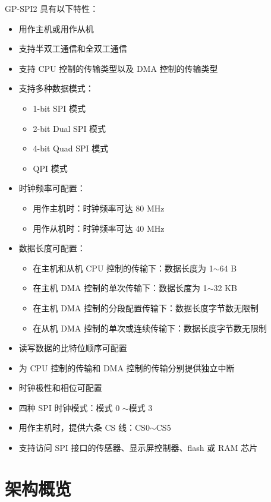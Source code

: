\documentclass[main\_\_CN.tex]{subfiles}
\begin{document}
GP-SPI2 具有以下特性：
\begin{itemize}
    \item 用作主机或用作从机
    \item 支持半双工通信和全双工通信
    \item 支持 CPU 控制的传输类型以及 DMA 控制的传输类型
    \item 支持多种数据模式：
        \begin{itemize}
            \item 1-bit SPI 模式
            \item 2-bit Dual SPI 模式
            \item 4-bit Quad SPI 模式
            \item QPI 模式
        \end{itemize}
    \item 时钟频率可配置：
        \begin{itemize}
        \item 用作主机时：时钟频率可达 80 MHz
            \item 用作从机时：时钟频率可达 40 MHz 
        \end{itemize}
    \item 数据长度可配置：
    \begin{itemize}
        \item 在主机和从机 CPU 控制的传输下：数据长度为 1$\sim$64 B
        \item 在主机 DMA 控制的单次传输下：数据长度为 1$\sim$32 KB
        \item 在主机 DMA 控制的分段配置传输下：数据长度字节数无限制
        \item 在从机 DMA 控制的单次或连续传输下：数据长度字节数无限制
    \end{itemize}
    \item 读写数据的比特位顺序可配置
    \item 为 CPU 控制的传输和 DMA 控制的传输分别提供独立中断 
    \item 时钟极性和相位可配置
    \item 四种 SPI 时钟模式：模式 0 $\sim$模式 3
    \item 用作主机时，提供六条 CS 线：CS0$\sim$CS5
    \item 支持访问 SPI 接口的传感器、显示屏控制器、flash 或 RAM 芯片
\end{itemize}

\section{架构概览}
\end{document}
